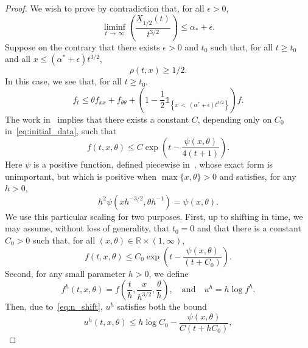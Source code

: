 \documentclass[AHL,Unicode,longabstracts]{cedram}
\newcommand{\R}{\mathbb{R}}
\newcommand{\1}{\mathds{1}}
\newcommand{\e}{\epsilon}
\begin{document}
\begin{proof}
We wish to prove by contradiction that, for all $\epsilon>0$,
\begin{equation*}
\liminf_{t\,\to\,\infty} \left (\frac{\underline{X}_{1/2}(t)}{t^{3/2}} \right) \leq \alpha_* + \epsilon.
\end{equation*}
Suppose on the contrary that there exists $\epsilon>0$ and $t_0$ such that, for all $t\geq t_0$ and all $x\leq (\alpha^* + \e) t^{3/2}$,
\begin{equation}\label{eq:contradiction_assumption}
\rho(t,x) \geq 1/2.
\end{equation}
In this case, we see that, for all $t \geq t_0$,
\begin{equation}\label{eq:upper_bound_ssoln}
f_t \leq \theta f_{xx} + f_{\theta\theta} + \left(1 - \frac{1}{2}\1_{ \left\{x\,<\,\left(\alpha^*+\e\right)t^{3/2}\right\}} \right)f.
\end{equation}
The work in~\cite[Section~3]{BHR_acceleration} implies that there exists a constant $C$, depending only on $C_0$ in~\eqref{eq:initial_data}, such that
\begin{equation*}
f(t,x,\theta) \leq C \exp\left(t - \frac{\psi(x,\theta)}{4(t + 1)}\right).
\end{equation*}
Here $\psi$ is a positive function, defined piecewise in~\cite[Section~3]{BHR_acceleration}, whose exact form is unimportant, but which is positive when $\max\{x,\theta\} > 0$ and satisfies, for any $h>0$,
\begin{equation*}
h^2 \psi\left(x h^{-3/2}, \theta h^{-1}\right) = \psi(x,\theta).
\end{equation*}
We use this particular scaling for two purposes. First, up to shifting in time, we may assume, without loss of generality, that $t_0 = 0$ and that there is a constant $C_0>0$ such that, for all $(x,\theta) \in \R \times (1,\infty)$,
\begin{equation}\label{eq:n_shift}
f(t,x,\theta) \leq C_0 \exp\left(t - \frac{\psi(x,\theta)}{(t + C_0)} \right).
\end{equation}
Second, for any small parameter $h>0$, we define
\begin{equation}\label{eq:Hopf_Cole}
f^h(t,x,\theta) = f\left (\dfrac t h, \dfrac x{h^{3/2}}, \dfrac \theta h\right),\quad \text{and}\quad u^h = h \log f^h.
\end{equation}
Then, due to~\eqref{eq:n_shift}, $u^h$ satisfies both the bound
\begin{equation}\label{eq:u_0^h}
u^h(t,x,\theta) \leq h \log C_0 - \frac{\psi(x,\theta)}{ C (t+ h C_0)},

\end{equation}
\end{proof}
\end{document}
